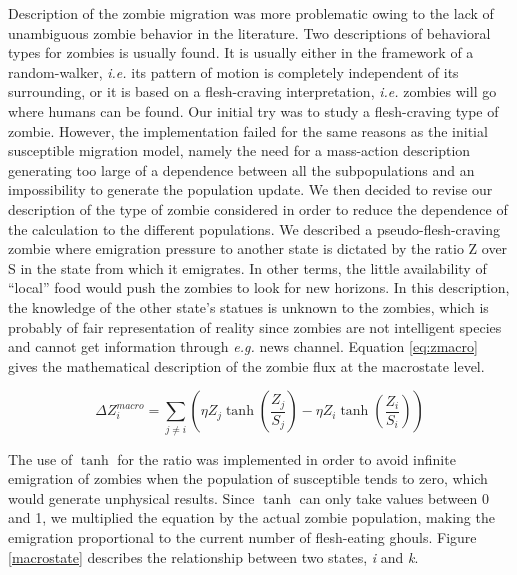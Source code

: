 \documentclass[11pt]{article} %
\begin{document}
Description of the zombie migration was more problematic owing to the lack of unambiguous zombie behavior in the literature. Two descriptions of behavioral types for zombies is usually found. It is usually either in the framework of a random-walker, \textit{i.e.} its pattern of motion is completely independent of its surrounding, or it is based on a flesh-craving interpretation, \textit{i.e.} zombies will go where humans can be found. Our initial try was to study a flesh-craving type of zombie. However, the implementation failed for the same reasons as the initial susceptible migration model, namely the need for a mass-action description generating too large of a dependence between all the subpopulations and an impossibility to generate the population update. We then decided to revise our description of the type of zombie considered in order to reduce the dependence of the calculation to the different populations. We described a pseudo-flesh-craving zombie where emigration pressure to another state is dictated by the ratio Z over S in the state from which it emigrates. In other terms, the little availability of ``local'' food would push the zombies to look for new horizons. In this description, the knowledge of the other state's statues is unknown to the zombies, which is probably of fair representation of reality since zombies are not intelligent species and cannot get information through \textit{e.g.} news channel. Equation \eqref{eq:zmacro} gives the mathematical description of the zombie flux at the macrostate level. 

\bigskip
\begin{equation} \label{eq:zmacro}
\Delta Z_{i}^{macro} = \sum_{j\neq i}{\left( \eta Z_{j}\tanh \left( \frac{Z_{j}}{S_{j}}\right) -\eta Z_{i}\tanh \left( \frac{Z_{i}}{S_{i}}\right) \right)}
\end{equation}
\bigskip

The use of $\tanh$ for the ratio was implemented in order to avoid infinite emigration of zombies when the population of susceptible tends to zero, which would generate unphysical results. Since $\tanh$ can only take values between 0 and 1, we multiplied the equation by the actual zombie population, making the emigration proportional to the current number of flesh-eating ghouls. Figure \ref{macrostate} describes the relationship between two states, \textit{i} and \textit{k}.
\end{document}
